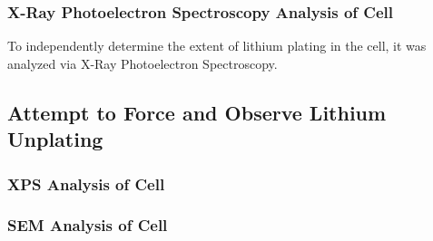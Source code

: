 \subsubsection{X-Ray Photoelectron Spectroscopy Analysis of Cell}
    To independently determine the extent of lithium plating in the cell, it was analyzed via X-Ray Photoelectron Spectroscopy.

\subsection{Attempt to Force and Observe Lithium Unplating}

\subsubsection{XPS Analysis of Cell}

\subsubsection{SEM Analysis of Cell}
